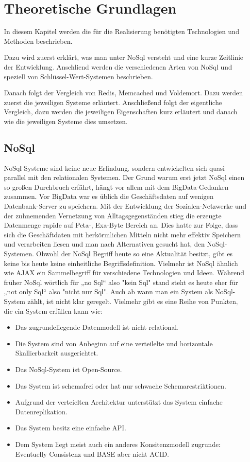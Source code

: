 \chapter{Theoretische Grundlagen}
In diesem Kapitel werden die für die Realisierung benötigten Technologien und
Methoden beschrieben.

Dazu wird zuerst erklärt, was man unter NoSql versteht und eine kurze Zeitlinie
der Entwicklung. Anschliend werden die verschiedenen Arten von NoSql und
speziell von Schlüssel-Wert-Systemen beschrieben.

Danach folgt der Vergleich von Redis, Memcached und Voldemort. Dazu werden
zuerst die jeweiligen Systeme erläutert. Anschließend folgt der eigentliche
Vergleich, dazu werden die jeweiligen Eigenschaften kurz erläutert und danach
wie die jeweiligen Systeme dies umsetzen.

\section{NoSql}
NoSql-Systeme sind keine neue Erfindung, sondern entwickelten sich quasi
parallel mit den relationalen Systemen. Der Grund warum erst jetzt NoSql einen
so großen Durchbruch erfährt, hängt vor allem mit dem BigData-Gedanken zusammen.
Vor BigData war es üblich die Geschäftsdaten auf wenigen Datenbank-Server zu
speichern. Mit der Entwicklung der Sozialen-Netzwerke und der zuhnemenden
Vernetzung von Alltagsgegenständen stieg die erzeugte Datenmenge rapide auf
Peta-, Exa-Byte Bereich an. Dies hatte zur Folge, dass sich die Geschäftdaten
mit herkörmlichen Mitteln nicht mehr effektiv Speichern und verarbeiten liesen
und man nach Alternativen gesucht hat, den NoSql-Systemen.
Obwohl der NoSql Begriff heute so eine Aktualität besitzt, gibt es keine bis
heute keine einheitliche Begriffsdefinition. Vielmehr ist NoSql ähnlich wie
\gls{AJAX} ein Sammelbegriff für verschiedene Technologien und Ideen. Während
früher NoSql wörtlich für „no Sql“ also "kein Sql" stand steht es heute eher für
„not only Sql“ also "nicht nur Sql". Auch ab wann man ein System als
NoSql-System zählt, ist nicht klar geregelt. Vielmehr gibt es eine Reihe von
Punkten, die ein System erfüllen kann wie: \cite{Edlich2011}

\begin{itemize}
\item Das zugrundeliegende Datenmodell ist nicht relational.
\item Die System sind von Anbeginn auf eine verteilelte und horizontale
Skallierbarkeit ausgerichtet.
\item Das NoSql-System ist Open-Source.
\item Das System ist schemafrei oder hat nur schwache Schemarestriktionen.
\item Aufgrund der verteielten Architektur unterstützt das System einfache
Datenreplikation.
\item Das System besitz eine einfache \gls{API}.
\item Dem System liegt meist auch ein anderes Konsitenzmodell zugrunde:
Eventuelly Consistenz und BASE aber nicht ACID.
\end{itemize}

